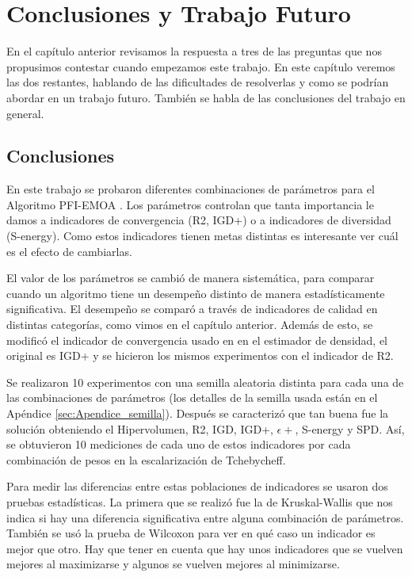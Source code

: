 \chapter{Conclusiones y Trabajo Futuro}

En el capítulo anterior revisamos la respuesta a tres de las preguntas que nos propusimos contestar cuando empezamos este trabajo. En este capítulo veremos las dos restantes, hablando de las dificultades de resolverlas y como se podrían abordar en un trabajo futuro. También se habla de las conclusiones del trabajo en general.


\section{Conclusiones}


En este trabajo se probaron diferentes combinaciones de parámetros para el Algoritmo PFI-EMOA \cite{PFI}. Los parámetros controlan que tanta importancia le damos a indicadores de convergencia (R2, IGD+) o a indicadores de diversidad (S-energy). Como estos indicadores tienen metas distintas es interesante ver cuál es el efecto de cambiarlas.

El valor de los parámetros se cambió de manera sistemática, para comparar cuando un algoritmo tiene un desempeño distinto de manera estadísticamente significativa. El desempeño se comparó a través de indicadores de calidad en distintas categorías, como vimos en el capítulo anterior. Además de esto, se modificó el indicador de convergencia usado en \cite{PFI} en el estimador de densidad, el original es IGD+ y se hicieron los mismos experimentos con el indicador de R2. 

Se realizaron 10 experimentos con una semilla aleatoria distinta para cada una de las combinaciones de parámetros (los detalles de la semilla usada están en el Apéndice \ref{sec:Apendice_semilla}). Después se caracterizó que tan buena fue la solución obteniendo el Hipervolumen, R2, IGD, IGD+, $\epsilon +$, S-energy y SPD. Así, se obtuvieron 10 mediciones de cada uno de estos indicadores por cada combinación de pesos en la escalarización de Tchebycheff. 

Para medir las diferencias entre estas poblaciones de indicadores se usaron dos pruebas estadísticas. La primera que se realizó fue la de Kruskal-Wallis que nos indica si hay una diferencia significativa entre alguna combinación de parámetros. También se usó la prueba de Wilcoxon para ver en qué caso un indicador es mejor que otro. Hay que tener en cuenta que hay unos indicadores que se vuelven mejores al maximizarse y algunos se vuelven mejores al minimizarse.  


